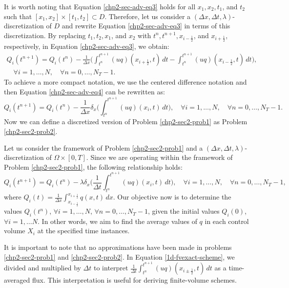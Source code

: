 It is worth noting that Equation \eqref{chp2-sec-adv-eq3} holds for all $x_1, x_2, t_1$, and $t_2$ such that $[x_1, x_2]
\times [t_1, t_2] \subset D$. Therefore, let us consider a $(\Delta x, \Delta t, \lambda)$-discretization of $D$ and 
rewrite Equation \eqref{chp2-sec-adv-eq3} in terms of this discretization. By replacing $t_1, t_2, x_1$, and $x_2$ with
$t^{n}, t^{n+1}, x_{i-\frac{1}{2}}$, and $x_{i+\frac{1}{2}}$, respectively, in Equation \eqref{chp2-sec-adv-eq3}, we obtain:
\begin{equation}
    \label{chp2-sec-adv-eq4}
	\begin{aligned}
		{Q}_i(t^{n+1}) =  {Q}_i(t^{n}) -
		\frac{1}{\Delta x}\bigg( \int_{t^{n}}^{t^{n+1}}
        	{(uq)}(x_{i+\frac{1}{2}}, t) \,dt -
		\int_{t^{n}}^{t^{n+1}}{(uq)}(x_{i-\frac{1}{2}}, t) \,dt \bigg), \\
		\quad \forall i = 1, \ldots, N,
		\quad \forall n = 0, \ldots, N_T-1.
	\end{aligned}
\end{equation}
To achieve a more compact notation, we use the centered difference notation
and then Equation \eqref{chp2-sec-adv-eq4} can be rewritten as:
\begin{equation}
    \label{chp2-sec-adv-eq6}
    {Q}_i(t^{n+1}) =  {Q}_i(t^{n}) -
	\frac{1}{\Delta x} \delta _x\bigg( \int_{t^{n}}^{t^{n+1}}
        {(uq)}(x_{i}, t) \,dt \bigg),
        \quad \forall i = 1, \ldots, N,
        \quad \forall n = 0, \ldots, N_T-1.
\end{equation}
Now we can define a discretized version of Problem \ref{chp2-sec2-prob1} as Problem \ref{chp2-sec2-prob2}.
\begin{prob}
	\label{chp2-sec2-prob2}
	Let us consider the framework of Problem \ref{chp2-sec2-prob1} and a $(\Delta x, \Delta t, \lambda)$-discretization of 
	$\Omega \times [0,T]$. Since we are operating within the framework of Problem \ref{chp2-sec2-prob1}, the following relationship holds:
	\begin{equation}
		\label{1d-fvexact-scheme}
		{Q}_i(t^{n+1}) = {Q}_i(t^{n}) - \lambda \delta_x\bigg( \frac{1}{\Delta t}\int_{t^{n}}^{t^{n+1}}{(uq)}(x_{i}, t) \,dt \bigg),
		 \quad \forall i = 1, \ldots, N, \quad \forall n = 0, \ldots, N_T-1,
	\end{equation}
	where ${Q}_i(t) = \frac{1}{\Delta x}\int_{x_{i-\frac{1}{2}}}^{x_{i+\frac{1}{2}}} {q}(x,t) \,dx$. 
	Our objective now is to determine the values ${Q}_i(t^{n})$, $\forall i = 1, \ldots, N$, $\forall n = 0, \ldots, N_T-1$,
	given the initial values ${Q}_i(0)$, $\forall i = 1, \ldots N$. 
	In other words, we aim to find the average values of ${q}$ in each control volume $X_i$ at the specified time instances.
\end{prob}
It is important to note that no approximations have been made in problems \eqref{chp2-sec2-prob1} and \eqref{chp2-sec2-prob2}. 
In Equation \eqref{1d-fvexact-scheme}, we divided and multiplied by $\Delta t$ to interpret
$\frac{1}{\Delta t}\int_{t^{n}}^{t^{n+1}}({uq})(x_{i\pm \frac{1}{2}}, t) \,dt$ 
as a time-averaged flux. This interpretation is useful for deriving finite-volume schemes.

